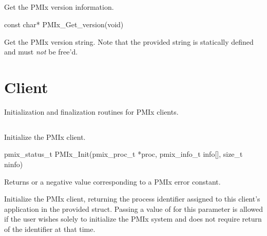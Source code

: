 \subsection{}

\summary

Get the PMIx version information.

\format

\cspecificstart
\begin{codepar}
const char* PMIx_Get_version(void)
\end{codepar}
\cspecificend

\descr

Get the \ac{PMIx} version string.
Note that the provided string is statically defined and must \textit{not} be free'd.

\section{Client}
\label{chap:api_init:client}

Initialization and finalization routines for \ac{PMIx} clients.

\subsection{}

\summary

Initialize the \ac{PMIx} client.

\format

\cspecificstart
\begin{codepar}
pmix_status_t
PMIx_Init(pmix_proc_t *proc,
          pmix_info_t info[], size_t ninfo)
\end{codepar}
\cspecificend

\begin{arglist}
\end{arglist}

Returns  or a negative value corresponding to a \ac{PMIx} error constant.

\descr

Initialize the \ac{PMIx} client, returning the process identifier assigned to this client's application in the provided  struct.
Passing a value of  for this parameter is allowed if the user wishes solely to initialize the \ac{PMIx} system and does not require return of the identifier at that time.

